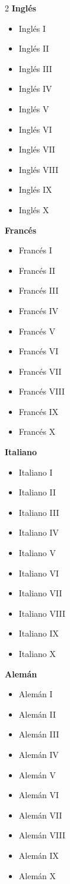 \documentclass[12pt,a4paper]{article}
\begin{document}
	\begin{multicols}{2}
		\textbf{Inglés}
		\begin{itemize}
			\item Inglés I
			\item Inglés II
			\item Inglés III
			\item Inglés IV
			\item Inglés V
			\item Inglés VI
			\item Inglés VII
			\item Inglés VIII
			\item Inglés IX
			\item Inglés X
		\end{itemize}
		
		\textbf{Francés}
		\begin{itemize}
			\item Francés I
			\item Francés II
			\item Francés III
			\item Francés IV
			\item Francés V
			\item Francés VI
			\item Francés VII
			\item Francés VIII
			\item Francés IX
			\item Francés X
		\end{itemize}
		
		\textbf{Italiano}
		\begin{itemize}
			\item Italiano I
			\item Italiano II
			\item Italiano III
			\item Italiano IV
			\item Italiano V
			\item Italiano VI
			\item Italiano VII
			\item Italiano VIII
			\item Italiano IX
			\item Italiano X
		\end{itemize}
		
		\textbf{Alemán}
		\begin{itemize}
			\item Alemán I
			\item Alemán II
			\item Alemán III
			\item Alemán IV
			\item Alemán V
			\item Alemán VI
			\item Alemán VII
			\item Alemán VIII
			\item Alemán IX
			\item Alemán X
		\end{itemize}
		

\end{multicols}
\end{document}

